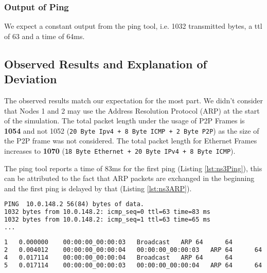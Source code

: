 \documentclass[parskip=full]{scrartcl}
\begin{document}
\subsubsection{Output of Ping}
We expect a constant output from the ping tool, i.e. 1032 transmitted bytes, a ttl of 63 and a time of 64ms.

\subsection{Observed Results and Explanation of Deviation}
The observed results match our expectation for the most part. 
We didn't consider that Nodes 1 and 2 may use the Address Resolution Protocol (ARP) at the start of the simulation.
The total packet length under the usage of P2P Frames is \textbf{1054} and not 1052 (\texttt{20 Byte Ipv4 + 8 Byte ICMP + 2 Byte P2P}) as the size of the P2P frame was not considered.
The total packet length for Ethernet Frames increases to \textbf{1070} (\texttt{18 Byte Ethernet + 20 Byte IPv4 + 8 Byte ICMP}).

The ping tool reports a time of 83ms for the first ping (Listing \ref{lst:ns3Ping}), this can be attributed to the fact that ARP packets are exchanged in the beginning and the first ping is delayed by that (Listing \ref{lst:ns3ARP}). 
\begin{lstlisting}[language=tex, breaklines, frame=single, caption={Ping output from the ns3 simulation}, label=lst:ns3Ping, float, floatplacement=h]
PING  10.0.148.2 56(84) bytes of data.
1032 bytes from 10.0.148.2: icmp_seq=0 ttl=63 time=83 ms
1032 bytes from 10.0.148.2: icmp_seq=1 ttl=63 time=65 ms
...
\end{lstlisting}

\begin{lstlisting}[language=tex, breaklines, frame=single, caption={ARP messages that delay the first ping}, label=lst:ns3ARP, float, floatplacement=h]
1	0.000000	00:00:00_00:00:03	Broadcast	ARP	64		64					
2	0.004012	00:00:00_00:00:04	00:00:00_00:00:03	ARP	64		64									
4	0.017114	00:00:00_00:00:04	Broadcast	ARP	64		64									
5	0.017114	00:00:00_00:00:03	00:00:00_00:00:04	ARP	64		64									

\end{lstlisting}

\end{document}
